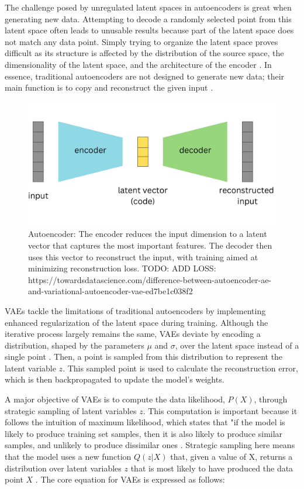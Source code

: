 The challenge posed by unregulated latent spaces in autoencoders is great when generating new data. Attempting to decode a randomly selected point from this latent space often leads to unusable results because part of the latent space does not match any data point. Simply trying to organize the latent space proves difficult as its structure is affected by the distribution of the source space, the dimensionality of the latent space, and the architecture of the encoder \citep{michelucci2022introduction}.
In essence, traditional autoencoders are not designed to generate new data; their main function is to copy and reconstruct the given input \citep{GoodfellowDeepLearning}.

\begin{figure}[ht]
    \centering
      \hspace{.8cm}
      \includegraphics[width=.7\columnwidth]{figures/Autoencoder.png}
      \caption{Autoencoder: The encoder reduces the input dimension to a latent vector that captures the most important features. The decoder then uses this vector to reconstruct the input, with training aimed at minimizing reconstruction loss. TODO: ADD LOSS: https://towardsdatascience.com/difference-between-autoencoder-ae-and-variational-autoencoder-vae-ed7be1c038f2}
      \label{fig:figureAE}
\end{figure}

VAEs tackle the limitations of traditional autoencoders by implementing enhanced regularization of the latent space during training. Although the iterative process largely remains the same, VAEs deviate by encoding a distribution, shaped by the parameters \(\mu\) and \(\sigma\), over the latent space instead of a single point \citep{doerschVAE}. Then, a point is sampled from this distribution to represent the latent variable \(z\). This sampled point is used to calculate the reconstruction error, which is then backpropagated to update the model's weights.

A major objective of VAEs is to compute the data likelihood, \(P(X)\), through strategic sampling of latent variables \(z\). This computation is important because it follows the intuition of maximum likelihood, which states that "if the model is likely to produce training set samples, then it is also likely to produce similar samples, and unlikely to produce dissimilar ones \citep{doerschVAE}. Strategic sampling here means that the model uses a new function \(Q(z|X)\) that, given a value of X, returns a distribution over latent variables \(z\) that is most likely to have produced the data point \(X\) \citep{doerschVAE}. The core equation for VAEs is expressed as follows:

